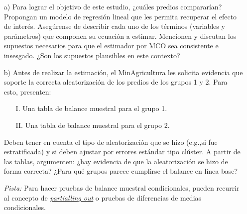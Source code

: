 \documentclass[a4paper]{article}
\begin{document}
\begin{itemize}

    \item[a)] Para lograr el objetivo de este estudio, ¿cuáles predios compararían? Propongan un modelo de regresión lineal que les permita recuperar el efecto de interés. Asegúrense de describir cada uno de los términos (variables y parámetros) que componen su ecuación a estimar. Mencionen y discutan los supuestos necesarios para que el estimador por MCO sea consistente e insesgado. ¿Son los supuestos plausibles en este contexto? \\
    
    \item[b)] Antes de realizar la estimación, el MinAgricultura les solicita evidencia que soporte la correcta aleatorización de los predios de los grupos 1 y 2. Para esto, presenten:
    
    \begin{itemize}
        \item[I.] Una tabla de balance muestral para el grupo 1.
        \item[II.] Una tabla de balance muestral para el grupo 2.
    \end{itemize}
    
    Deben tener en cuenta el tipo de aleatorización que se hizo (e.g.,si fue estratificada) y si deben ajustar por errores estándar tipo clúster. A partir de las tablas, argumenten: ¿hay evidencia de que la aleatorización se hizo de forma correcta? ¿Para qué grupos parece cumplirse el balance en línea base?
    
    \textit{Pista:} Para hacer pruebas de balance muestral condicionales, pueden recurrir al concepto de \href{https://www.dropbox.com/s/grsard9s9u8st0t/Partial\%20Regression.pdf?dl=0}{\underline{\textit{partialling out}}} o pruebas de diferencias de medias condicionales.\\
    

\end{itemize}
\end{document}
